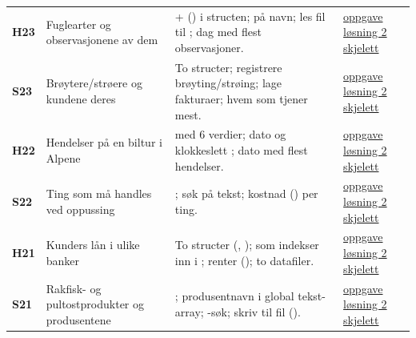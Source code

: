 \begin{center}
\begin{longtable}{@{}L{0.9cm}L{4.0cm}L{8.6cm}L{1.8cm}@{}}
\textbf{H23} & Fuglearter og observasjonene av dem &  +  () i structen;  på navn; les fil til ; dag med flest observasjoner. & \href{https://frh.folk.ntnu.no/grprog/eksamen/ex_h23.pdf}{oppgave} \newline \href{https://frh.folk.ntnu.no/grprog/eksamen/ex_h23_2.c}{løsning 2} \newline \href{https://frh.folk.ntnu.no/grprog/eksamen/ex_h23_2.tpl}{skjelett} \\
\textbf{S23} & Brøytere/strøere og kundene deres & To structer; registrere brøyting/strøing; lage fakturaer; hvem som tjener mest. & \href{https://frh.folk.ntnu.no/grprog/eksamen/ex_s23.pdf}{oppgave} \newline \href{https://frh.folk.ntnu.no/grprog/eksamen/ex_s23_2.c}{løsning 2} \newline \href{https://frh.folk.ntnu.no/grprog/eksamen/ex_s23_2.tpl}{skjelett} \\
\textbf{H22} & Hendelser på en biltur i Alpene &  med 6 verdier; dato  og klokkeslett ; dato med flest hendelser. & \href{https://frh.folk.ntnu.no/grprog/eksamen/ex_h22.pdf}{oppgave} \newline \href{https://frh.folk.ntnu.no/grprog/eksamen/ex_h22_2.c}{løsning 2} \newline \href{https://frh.folk.ntnu.no/grprog/eksamen/ex_h22_2.tpl}{skjelett} \\
\textbf{S22} & Ting som må handles ved oppussing & ; søk på tekst; kostnad () per ting. & \href{https://frh.folk.ntnu.no/grprog/eksamen/ex_s22.pdf}{oppgave} \newline \href{https://frh.folk.ntnu.no/grprog/eksamen/ex_s22_2.c}{løsning 2} \newline \href{https://frh.folk.ntnu.no/grprog/eksamen/ex_s22_2.tpl}{skjelett} \\
\textbf{H21} & Kunders lån i ulike banker & To structer (, );  som indekser inn i ; renter (); to datafiler. & \href{https://frh.folk.ntnu.no/grprog/eksamen/ex_h21.pdf}{oppgave} \newline \href{https://frh.folk.ntnu.no/grprog/eksamen/ex_h21_2.c}{løsning 2} \newline \href{https://frh.folk.ntnu.no/grprog/eksamen/ex_h21_2.tpl}{skjelett} \\
\textbf{S21} & Rakfisk- og pultostprodukter og produsentene & ; produsentnavn i global tekst-array; -søk; skriv til fil (). & \href{https://frh.folk.ntnu.no/grprog/eksamen/ex_s21.pdf}{oppgave} \newline \href{https://frh.folk.ntnu.no/grprog/eksamen/ex_s21_2.c}{løsning 2} \newline \href{https://frh.folk.ntnu.no/grprog/eksamen/ex_s21_2.tpl}{skjelett} \\

\end{longtable}
\end{center}
